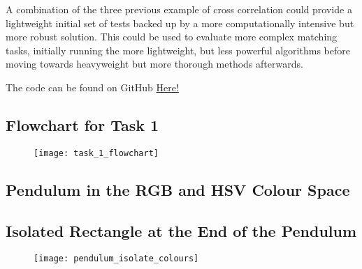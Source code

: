 \documentclass[conference]{IEEEtran}
\begin{document}
A combination of the three previous example of cross correlation could provide a lightweight initial set of tests backed up by a more computationally intensive but more robust solution. This could be used to evaluate more complex matching tasks, initially running the more lightweight, but less powerful algorithms before moving towards heavyweight but more thorough methods afterwards. 





The code can be found on GitHub \href{https://github.com/LukeDWaller99/Aint308}{Here!} 

\onecolumn

\begin{appendix}

\subsection{Flowchart for Task 1}

\begin{figure}[H]
\centerline{\texttt{[image: task\_1\_flowchart]}}
\end{figure}

\label{appendix:task_1_flowchart}

\subsection{Pendulum in the RGB and HSV Colour Space}

\begin{figure}[H]
\centering
{}
\end{figure}

\label{appendix:pendulum_rgb_hsv_space}

\subsection{Isolated Rectangle at the End of the Pendulum}

\begin{figure}[H]
\centerline{\texttt{[image: pendulum\_isolate\_colours]}}
\end{figure}

\label{appendix:isolated_rectangle}


\end{appendix}
\end{document}
